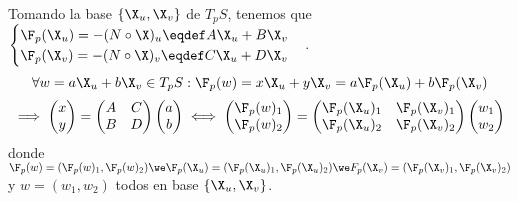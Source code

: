 Tomando la base $\{\X_u, \X_v\}$ de $T_pS$, tenemos que $\begin{cases}
		\F_p(\X_u) = - (N\circ \X)_u \eqdef A \X_u + B\X_v \\
		\F_p(\X_v) = - (N\circ \X)_v \eqdef C \X_u + D\X_v
	\end{cases}$.
\[\forall w = a\X_u + b\X_v \in T_pS : \F_p(w) = x\X_u + y\X_v = a \F_p(\X_u) + b \F_p(\X_v)\]
\[\implies \begin{pmatrix}
		x \\ y
	\end{pmatrix} = \begin{pmatrix}
		A & C \\ B & D
	\end{pmatrix} \begin{pmatrix}
		a \\ b
	\end{pmatrix} \iff \begin{pmatrix}
		\F_p(w)_1 \\ \F_p(w)_2
	\end{pmatrix} = \begin{pmatrix}
		\F_p(\X_u)_1 & \F_p(\X_v)_1 \\
		\F_p(\X_u)_2 & \F_p(\X_v)_2
	\end{pmatrix} \begin{pmatrix}
		w_1 \\ w_2
	\end{pmatrix}\]
donde $\F_p(w) = (\F_p(w)_1, \F_p(w)_2) \we \F_p(\X_u) = (\F_p(\X_u)_1, \F_p(\X_u)_2) \we F_p(\X_v) = (\F_p(\X_v)_1, \F_p(\X_v)_2)$ y $w = (w_1, w_2)$ todos en base $\{\X_u, \X_v\}$.

